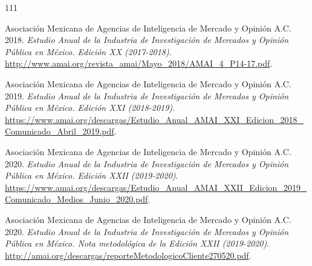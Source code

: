 \documentclass[11pt, oneside]{book}
\begin{document}
\begin{thebibliography}{111}







 Asociación Mexicana de Agencias de Inteligencia de Mercado y Opinión A.C. 2018. \emph{Estudio Anual de la Industria de Investigación de Mercados y Opinión Pública en México. Edición XX (2017-2018)}. \url{http://www.amai.org/revista_amai/Mayo_2018/AMAI_4_P14-17.pdf}.

 Asociación Mexicana de Agencias de Inteligencia de Mercado y Opinión A.C. 2019. \emph{Estudio Anual de la Industria de Investigación de Mercados y Opinión Pública en México. Edición XXI (2018-2019)}. \url{https://www.amai.org/descargas/Estudio_Anual_AMAI_XXI_Edicion_2018_Comunicado_Abril_2019.pdf}.

 Asociación Mexicana de Agencias de Inteligencia de Mercado y Opinión A.C. 2020. \emph{Estudio Anual de la Industria de Investigación de Mercados y Opinión Pública en México. Edición XXII (2019-2020)}. \url{https://www.amai.org/descargas/Estudio_Anual_AMAI_XXII_Edicion_2019_Comunicado_Medios_Junio_2020.pdf}.

 Asociación Mexicana de Agencias de Inteligencia de Mercado y Opinión A.C. 2020. \emph{Estudio Anual de la Industria de Investigación de Mercados y Opinión Pública en México. Nota metodológica de la Edición XXII (2019-2020)}. \url{http://amai.org/descargas/reporteMetodologicoCliente270520.pdf}.





\end{thebibliography}
\end{document}
